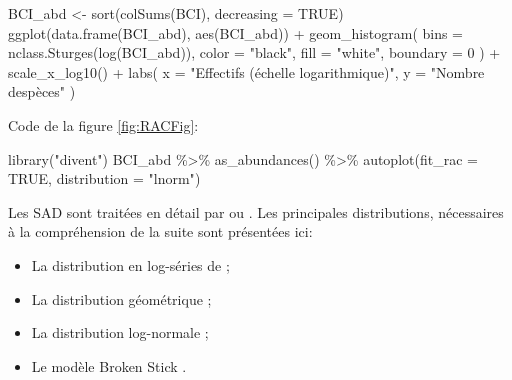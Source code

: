 \documentclass[
  11pt,
  american,
  a4paper,
  extrafontsizes,onecolumn,openright
  ]{memoir}
\newenvironment{Shaded}{\begin{snugshade}}{\end{snugshade}}
\newcommand{\AttributeTok}[1]{\textcolor[rgb]{0.77,0.63,0.00}{#1}}
\newcommand{\ConstantTok}[1]{\textcolor[rgb]{0.00,0.00,0.00}{#1}}
\newcommand{\DecValTok}[1]{\textcolor[rgb]{0.00,0.00,0.81}{#1}}
\newcommand{\FunctionTok}[1]{\textcolor[rgb]{0.00,0.00,0.00}{#1}}
\newcommand{\NormalTok}[1]{#1}
\newcommand{\OtherTok}[1]{\textcolor[rgb]{0.56,0.35,0.01}{#1}}
\newcommand{\SpecialCharTok}[1]{\textcolor[rgb]{0.00,0.00,0.00}{#1}}
\newcommand{\StringTok}[1]{\textcolor[rgb]{0.31,0.60,0.02}{#1}}
\providecommand{\tightlist}{%
  \setlength{\itemsep}{0pt}\setlength{\parskip}{0pt}}
\begin{document}
\begin{Shaded}
\begin{Highlighting}[]
\NormalTok{BCI\_abd }\OtherTok{\textless{}{-}} \FunctionTok{sort}\NormalTok{(}\FunctionTok{colSums}\NormalTok{(BCI), }\AttributeTok{decreasing =} \ConstantTok{TRUE}\NormalTok{)}
\FunctionTok{ggplot}\NormalTok{(}\FunctionTok{data.frame}\NormalTok{(BCI\_abd), }\FunctionTok{aes}\NormalTok{(BCI\_abd)) }\SpecialCharTok{+} 
  \FunctionTok{geom\_histogram}\NormalTok{(}
    \AttributeTok{bins =} \FunctionTok{nclass.Sturges}\NormalTok{(}\FunctionTok{log}\NormalTok{(BCI\_abd)), }
    \AttributeTok{color =} \StringTok{"black"}\NormalTok{, }
    \AttributeTok{fill =} \StringTok{"white"}\NormalTok{,}
    \AttributeTok{boundary =} \DecValTok{0}
\NormalTok{  ) }\SpecialCharTok{+}
  \FunctionTok{scale\_x\_log10}\NormalTok{() }\SpecialCharTok{+}
  \FunctionTok{labs}\NormalTok{(}
    \AttributeTok{x =} \StringTok{"Effectifs (échelle logarithmique)"}\NormalTok{, }
    \AttributeTok{y =} \StringTok{"Nombre d\textquotesingle{}espèces"}
\NormalTok{  )}
\end{Highlighting}
\end{Shaded}

\normalsize

Code de la figure \ref{fig:RACFig}:

\scriptsize

\begin{Shaded}
\begin{Highlighting}[]
\FunctionTok{library}\NormalTok{(}\StringTok{"divent"}\NormalTok{)}
\NormalTok{BCI\_abd }\SpecialCharTok{\%\textgreater{}\%} 
  \FunctionTok{as\_abundances}\NormalTok{() }\SpecialCharTok{\%\textgreater{}\%} 
  \FunctionTok{autoplot}\NormalTok{(}\AttributeTok{fit\_rac =} \ConstantTok{TRUE}\NormalTok{, }\AttributeTok{distribution =} \StringTok{"lnorm"}\NormalTok{)}
\end{Highlighting}
\end{Shaded}

\normalsize

Les SAD sont traitées en détail par \textcite{Magurran1988} ou \textcite{McGill2007}.
Les principales distributions, nécessaires à la compréhension de la suite sont présentées ici:

\begin{itemize}
\tightlist
\item
  La distribution en log-séries de \textcite{Fisher1943};
\item
  La distribution géométrique \autocite{Motomura1932,Whittaker1972};
\item
  La distribution log-normale \autocite{Preston1948};
\item
  Le modèle Broken Stick \autocite{MacArthur1957}.
\end{itemize}
\end{document}
